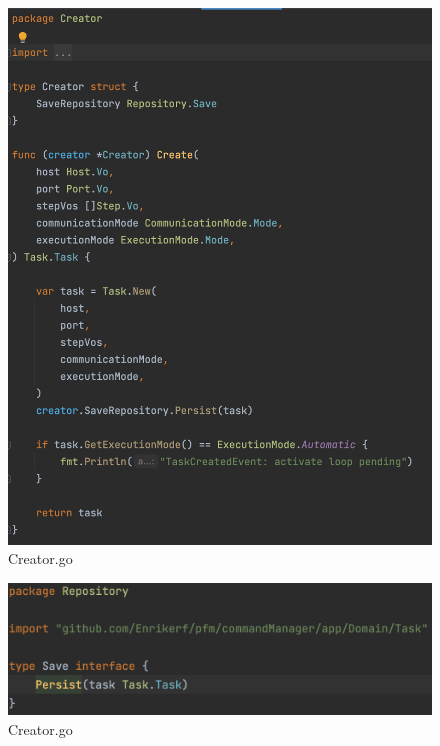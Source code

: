 \begin{figure}[H]
    \centering
    \includegraphics[height=0.5\textheight]{./part/Ejecucion/Seguimiento/CreateTaskUseCase/img/PFM - creator}
    \caption{Creator.go}\label{fig:Creator}
\end{figure}

\begin{figure}[H]
    \centering
    \includegraphics[height=0.2\textheight]{./part/Ejecucion/Seguimiento/CreateTaskUseCase/img/PFM - SavePort}
    \caption{Creator.go}\label{fig:SavePort}
\end{figure}

